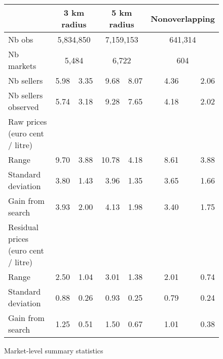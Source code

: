 \documentclass[english]{article}
\begin{document}
\begin{figure}[!h]
  \caption{Market-level summary statistics}
    \begin{tabular}{lrrrrrr}
    \hline
    \hline
    & \multicolumn{2}{c}{3 km radius} & \multicolumn{2}{c}{5 km radius} & \multicolumn{2}{c}{Nonoverlapping} \\
    \hline
    Nb obs & \multicolumn{2}{c}{5,834,850} & \multicolumn{2}{c}{7,159,153} & \multicolumn{2}{c}{641,314} \\
    Nb markets & \multicolumn{2}{c}{5,484} & \multicolumn{2}{c}{6,722} & \multicolumn{2}{c}{604} \\
    Nb sellers & 5.98  & 3.35  & 9.68  & 8.07  & 4.36  & 2.06 \\
    Nb sellers observed & 5.74  & 3.18  & 9.28  & 7.65  & 4.18  & 2.02 \\
    \hline
    Raw prices (euro cent / litre) &       &       &       &       &       &  \\
    Range & 9.70  & 3.88  & 10.78 & 4.18  & 8.61  & 3.88 \\
    Standard deviation & 3.80  & 1.43  & 3.96  & 1.35  & 3.65  & 1.66 \\
    Gain from search & 3.93  & 2.00  & 4.13  & 1.98  & 3.40  & 1.75 \\
    \hline
    Residual prices (euro cent / litre) &       &       &       &       &       &  \\
    Range & 2.50  & 1.04  & 3.01  & 1.38  & 2.01  & 0.74 \\
    Standard deviation & 0.88  & 0.26  & 0.93  & 0.25  & 0.79  & 0.24 \\
    Gain from search & 1.25  & 0.51  & 1.50  & 0.67  & 1.01  & 0.38 \\
    \hline
    \hline
\end{tabular}
\label{tab:station_stats_des}
\end{figure}
\end{document}

